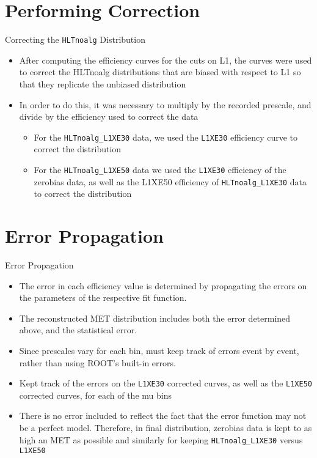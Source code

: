 \documentclass[]{beamer}
\begin{document}
\section{Performing Correction}
\begin{frame}{Correcting the \texttt{HLTnoalg} Distribution}
		\begin{itemize}
				\item After computing the efficiency curves for the cuts on L1, the curves were used to correct the HLTnoalg distributions that are biased with respect to L1 so that they replicate the unbiased distribution
				\item In order to do this, it was necessary to multiply by the recorded prescale, and divide by the efficiency used to correct the data
				\begin{itemize}
						\item For the \texttt{HLTnoalg\_L1XE30} data, we used the \texttt{L1XE30} efficiency curve to correct the distribution
						\item For the \texttt{HLTnoalg\_L1XE50} data we used the \texttt{L1XE30} efficiency of the zerobias data, as well as the L1XE50 efficiency of \texttt{HLTnoalg\_L1XE30} data to correct the distribution
				\end{itemize}
		\end{itemize}
\end{frame}
\section{Error Propagation}
\begin{frame}{Error Propagation}
		\begin{itemize}
				\item The error in each efficiency value is determined by propagating the errors on the parameters of the respective fit function.
				\item The reconstructed MET distribution includes both the error determined above, and the statistical error. 
				\item Since prescales vary for each bin, must keep track of errors event by event, rather than using ROOT’s built-in errors. 
				\item Kept track of the errors on the \texttt{L1XE30} corrected curves, as well as the \texttt{L1XE50} corrected curves, for each of the mu bins
				\item There is no error included to reflect the fact that the error function may not be a perfect model. Therefore, in final distribution, zerobias data is kept to as high an MET as possible and similarly for keeping \texttt{HLTnoalg\_L1XE30} versus \texttt{L1XE50
	} \end{itemize}
\end{frame}
\begin{frame}
\end{frame}
\begin{frame}
\end{frame}
\end{document}
